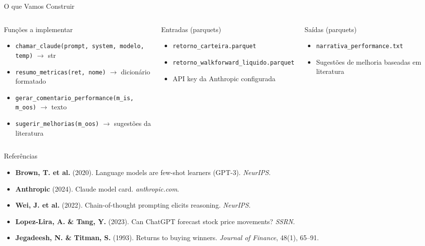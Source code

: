 \documentclass[aspectratio=169,12pt]{beamer}
\begin{document}
\begin{frame}[fragile]{O que Vamos Construir}
\begin{columns}[T]
\begin{block}{Funções a implementar}
\begin{itemize}
  \item \texttt{chamar\_claude(prompt, system, modelo, temp)} $\to$ str
  \item \texttt{resumo\_metricas(ret, nome)} $\to$ dicionário formatado
  \item \texttt{gerar\_comentario\_performance(m\_is, m\_oos)} $\to$ texto
  \item \texttt{sugerir\_melhorias(m\_oos)} $\to$ sugestões da literatura
\end{itemize}
\end{block}
\begin{block}{Entradas (parquets)}
\begin{itemize}
  \item \texttt{retorno\_carteira.parquet}
  \item \texttt{retorno\_walkforward\_liquido.parquet}
  \item API key da Anthropic configurada
\end{itemize}
\end{block}
\vspace{.4em}
\begin{exampleblock}{Saídas (parquets)}
\begin{itemize}
  \item \texttt{narrativa\_performance.txt}
  \item Sugestões de melhoria baseadas em literatura
\end{itemize}
\end{exampleblock}
\end{columns}
\end{frame}

\begin{frame}[fragile]{Referências}
\begin{multicols}{2}
\tiny
\begin{itemize}
  \item \textbf{Brown, T. et al.} (2020). Language models are few-shot learners (GPT-3). \textit{NeurIPS}.
  \item \textbf{Anthropic} (2024). Claude model card. \textit{anthropic.com}.
  \item \textbf{Wei, J. et al.} (2022). Chain-of-thought prompting elicits reasoning. \textit{NeurIPS}.
  \item \textbf{Lopez-Lira, A. \& Tang, Y.} (2023). Can ChatGPT forecast stock price movements? \textit{SSRN}.
  \item \textbf{Jegadeesh, N. \& Titman, S.} (1993). Returns to buying winners. \textit{Journal of Finance}, 48(1), 65--91.
\end{itemize}
\end{multicols}
\end{frame}
\end{document}
